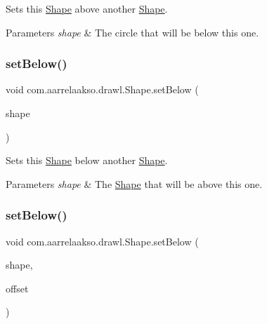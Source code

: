 Sets this \hyperlink{classcom_1_1aarrelaakso_1_1drawl_1_1_shape}{Shape} above another \hyperlink{classcom_1_1aarrelaakso_1_1drawl_1_1_shape}{Shape}. 


\begin{DoxyParams}{Parameters}
{\em shape} & The circle that will be below this one. \\
\hline
\end{DoxyParams}
\mbox{\label{classcom_1_1aarrelaakso_1_1drawl_1_1_shape_a4147526667449f5beb534d4404ba8f77}} 
\subsubsection{\texorpdfstring{set\+Below()}{setBelow()}\hspace{0.1cm}{\footnotesize\ttfamily [1/2]}}
{\footnotesize\ttfamily void com.\+aarrelaakso.\+drawl.\+Shape.\+set\+Below (\begin{DoxyParamCaption}\item[{@Not\+Null final \hyperlink{classcom_1_1aarrelaakso_1_1drawl_1_1_shape}{Shape}}]{shape }\end{DoxyParamCaption})}



Sets this \hyperlink{classcom_1_1aarrelaakso_1_1drawl_1_1_shape}{Shape} below another \hyperlink{classcom_1_1aarrelaakso_1_1drawl_1_1_shape}{Shape}. 


\begin{DoxyParams}{Parameters}
{\em shape} & The \hyperlink{classcom_1_1aarrelaakso_1_1drawl_1_1_shape}{Shape} that will be above this one. \\
\hline
\end{DoxyParams}
\mbox{\label{classcom_1_1aarrelaakso_1_1drawl_1_1_shape_a63c902c4e79235901744c6d83544fa54}} 
\subsubsection{\texorpdfstring{set\+Below()}{setBelow()}\hspace{0.1cm}{\footnotesize\ttfamily [2/2]}}
{\footnotesize\ttfamily void com.\+aarrelaakso.\+drawl.\+Shape.\+set\+Below (\begin{DoxyParamCaption}\item[{@Not\+Null final \hyperlink{classcom_1_1aarrelaakso_1_1drawl_1_1_shape}{Shape}}]{shape,  }\item[{@Not\+Null final \hyperlink{classcom_1_1aarrelaakso_1_1drawl_1_1_measure}{Measure}}]{offset }\end{DoxyParamCaption})}



